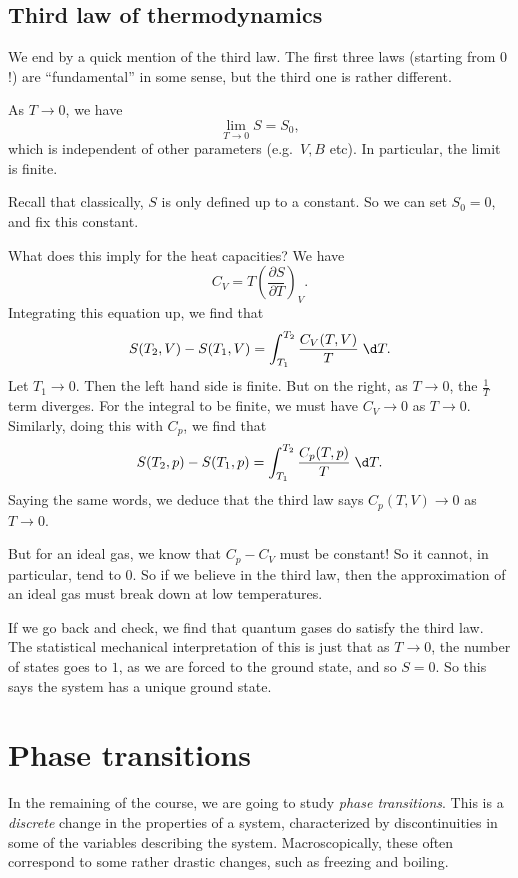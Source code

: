 \documentclass[a4paper]{article}
\begin{document}
\subsection{Third law of thermodynamics}
We end by a quick mention of the third law. The first three laws (starting from $0$!) are ``fundamental'' in some sense, but the third one is rather different.
\begin{law}
  As $T \to 0$, we have
  \[
    \lim_{T \to 0}S = S_0,
  \]
  which is independent of other parameters (e.g.\ $V, B$ etc). In particular, the limit is finite.
\end{law}
Recall that classically, $S$ is only defined up to a constant. So we can set $S_0 = 0$, and fix this constant.

What does this imply for the heat capacities? We have
\[
  C_V = T \left(\frac{\partial S}{\partial T}\right)_V.
\]
Integrating this equation up, we find that
\[
  S(T_2, V) - S(T_1, V) = \int_{T_1}^{T_2} \frac{C_V(T, V)}{T}\;\d T.
\]
Let $T_1 \to 0$. Then the left hand side is finite. But on the right, as $T \to 0$, the $\frac{1}{T}$ term diverges. For the integral to be finite, we must have $C_V \to 0$ as $T \to 0$. Similarly, doing this with $C_p$, we find that
\[
  S(T_2, p) - S(T_1, p) = \int_{T_1}^{T_2} \frac{C_p(T, p)}{T}\;\d T.
\]
Saying the same words, we deduce that the third law says $C_p(T, V) \to 0$ as $T \to 0$.

But for an ideal gas, we know that $C_p - C_V$ must be constant! So it cannot, in particular, tend to $0$. So if we believe in the third law, then the approximation of an ideal gas must break down at low temperatures.

If we go back and check, we find that quantum gases do satisfy the third law. The statistical mechanical interpretation of this is just that as $T \to 0$, the number of states goes to $1$, as we are forced to the ground state, and so $S = 0$. So this says the system has a unique ground state.

\section{Phase transitions}
In the remaining of the course, we are going to study \emph{phase transitions}. This is a \emph{discrete} change in the properties of a system, characterized by discontinuities in some of the variables describing the system. Macroscopically, these often correspond to some rather drastic changes, such as freezing and boiling.
\end{document}
